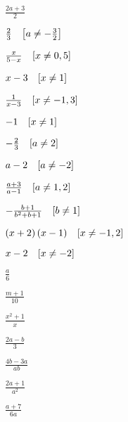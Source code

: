 \documentclass[11pt,a4paper,twoside]{article}
\begin{document}
\begin{answers}
  \begin{inparaenum}[\bfseries 1.]
  \item   \begin{inparaenum}
          \item	$\frac{2a + 3}{2}$
          \item	$\frac{2}{3} \hspace{2ex} \left[a \neq -\frac{3}{2}\right]$
          \item	$\frac{x}{5 - x} \hspace{2ex} \left[x \neq 0,5\right]$
          \item	$x - 3 \hspace{2ex} \left[x \neq 1\right]$
          \item	$\frac{1}{x - 3} \hspace{2ex} \left[x \neq -1, 3\right]$
          \item	$-1 \hspace{2ex} \left[x \neq 1\right]$
          \item	$-\frac{2}{3} \hspace{2ex} \left[a \neq 2\right]$
          \item	$a - 2 \hspace{2ex} \left[a \neq -2\right]$
          \item	$\frac{a + 3}{a - 1} \hspace{2ex} \left[a \neq 1, 2\right]$
          \item	$-\frac{b + 1}{b^2 + b + 1} \hspace{2ex} \left[b \neq 1\right]$
          \item	$\left(x+ 2\right)\left(x - 1\right)\hspace{2ex} \left[x \neq -1, 2\right]$
          \item	$x - 2 \hspace{2ex} \left[x \neq -2\right]$
          \end{inparaenum}
  \item   \begin{inparaenum}
          \item	$\frac{a}{6}$
          \item	$\frac{m + 1}{10}$
          \item	$\frac{x^2 +1}{x}$
          \item	$\frac{2a - b}{3}$
          \item	$\frac{4b - 3a}{ab}$
          \item	$\frac{2a + 1}{a^2}$
          \item	$\frac{a + 7}{6a}$

\end{inparaenum}
\end{inparaenum}
\end{answers}
\end{document}
